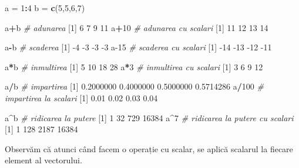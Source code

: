 \documentclass[]{article}
\newenvironment{Shaded}{\begin{snugshade}}{\end{snugshade}}
\newcommand{\CommentTok}[1]{\textcolor[rgb]{0.56,0.35,0.01}{\textit{#1}}}
\newcommand{\DecValTok}[1]{\textcolor[rgb]{0.00,0.00,0.81}{#1}}
\newcommand{\FloatTok}[1]{\textcolor[rgb]{0.00,0.00,0.81}{#1}}
\newcommand{\KeywordTok}[1]{\textcolor[rgb]{0.13,0.29,0.53}{\textbf{#1}}}
\newcommand{\NormalTok}[1]{#1}
\newcommand{\OperatorTok}[1]{\textcolor[rgb]{0.81,0.36,0.00}{\textbf{#1}}}
\newcommand{\StringTok}[1]{\textcolor[rgb]{0.31,0.60,0.02}{#1}}
\begin{document}
\begin{Shaded}
\begin{Highlighting}[]
\NormalTok{a =}\StringTok{ }\DecValTok{1}\OperatorTok{:}\DecValTok{4}
\NormalTok{b =}\StringTok{ }\KeywordTok{c}\NormalTok{(}\DecValTok{5}\NormalTok{,}\DecValTok{5}\NormalTok{,}\DecValTok{6}\NormalTok{,}\DecValTok{7}\NormalTok{)}

\NormalTok{a}\OperatorTok{+}\NormalTok{b  }\CommentTok{# adunarea }
\NormalTok{[}\DecValTok{1}\NormalTok{]  }\DecValTok{6}  \DecValTok{7}  \DecValTok{9} \DecValTok{11}
\NormalTok{a}\OperatorTok{+}\DecValTok{10} \CommentTok{# adunarea cu scalari}
\NormalTok{[}\DecValTok{1}\NormalTok{] }\DecValTok{11} \DecValTok{12} \DecValTok{13} \DecValTok{14}

\NormalTok{a}\OperatorTok{-}\NormalTok{b  }\CommentTok{# scaderea}
\NormalTok{[}\DecValTok{1}\NormalTok{] }\DecValTok{-4} \DecValTok{-3} \DecValTok{-3} \DecValTok{-3}
\NormalTok{a}\DecValTok{-15} \CommentTok{# scaderea cu scalari}
\NormalTok{[}\DecValTok{1}\NormalTok{] }\DecValTok{-14} \DecValTok{-13} \DecValTok{-12} \DecValTok{-11}

\NormalTok{a}\OperatorTok{*}\NormalTok{b }\CommentTok{# inmultirea}
\NormalTok{[}\DecValTok{1}\NormalTok{]  }\DecValTok{5} \DecValTok{10} \DecValTok{18} \DecValTok{28}
\NormalTok{a}\OperatorTok{*}\DecValTok{3} \CommentTok{# inmultirea cu scalari}
\NormalTok{[}\DecValTok{1}\NormalTok{]  }\DecValTok{3}  \DecValTok{6}  \DecValTok{9} \DecValTok{12}

\NormalTok{a}\OperatorTok{/}\NormalTok{b }\CommentTok{# impartirea}
\NormalTok{[}\DecValTok{1}\NormalTok{] }\FloatTok{0.2000000} \FloatTok{0.4000000} \FloatTok{0.5000000} \FloatTok{0.5714286}
\NormalTok{a}\OperatorTok{/}\DecValTok{100} \CommentTok{# impartirea la scalari}
\NormalTok{[}\DecValTok{1}\NormalTok{] }\FloatTok{0.01} \FloatTok{0.02} \FloatTok{0.03} \FloatTok{0.04}

\NormalTok{a}\OperatorTok{^}\NormalTok{b }\CommentTok{# ridicarea la putere}
\NormalTok{[}\DecValTok{1}\NormalTok{]     }\DecValTok{1}    \DecValTok{32}   \DecValTok{729} \DecValTok{16384}
\NormalTok{a}\OperatorTok{^}\DecValTok{7} \CommentTok{# ridicarea la putere cu scalari}
\NormalTok{[}\DecValTok{1}\NormalTok{]     }\DecValTok{1}   \DecValTok{128}  \DecValTok{2187} \DecValTok{16384}
\end{Highlighting}
\end{Shaded}

Observăm că atunci când facem o operație cu scalar, se aplică scalarul
la fiecare element al vectorului.
\end{document}
